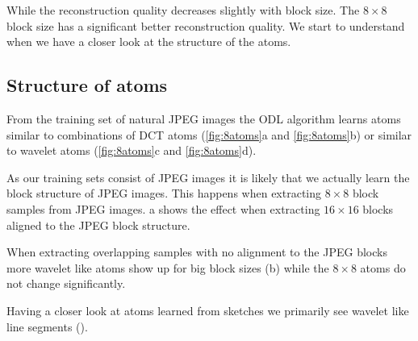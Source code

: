 While the reconstruction quality decreases slightly with block size. 
The $8\times8$ block size has a significant better reconstruction quality. 
We start to understand when we have a closer look at the structure of
the atoms. 

\newpage
\subsection{Structure of atoms}
From the training set of natural JPEG images the ODL algorithm learns atoms
similar to combinations of DCT atoms (\ref{fig:8atoms}a and  \ref{fig:8atoms}b)
or similar to wavelet atoms (\ref{fig:8atoms}c and \ref{fig:8atoms}d).

As our training sets consist of JPEG images it is likely that we actually learn
the block structure of JPEG images. This happens when extracting
$8\times 8$ block samples from JPEG images. a shows
the effect when extracting $16\times 16$ blocks aligned to the JPEG block
structure.

When extracting overlapping samples with no alignment to the JPEG
blocks more wavelet like atoms show up for big block sizes
(b) while the $8\times 8$ atoms do not change
significantly. 

Having a closer look at atoms learned from sketches we primarily see wavelet
like line segments ().

